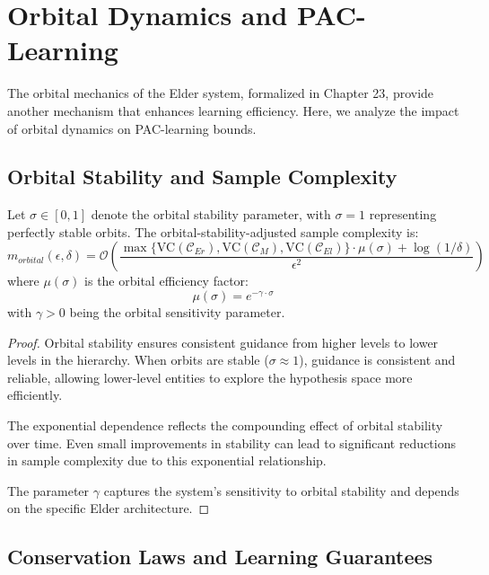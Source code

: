 \section{Orbital Dynamics and PAC-Learning}

The orbital mechanics of the Elder system, formalized in Chapter 23, provide another mechanism that enhances learning efficiency. Here, we analyze the impact of orbital dynamics on PAC-learning bounds.

\subsection{Orbital Stability and Sample Complexity}

\begin{theorem}
Let $\sigma \in [0, 1]$ denote the orbital stability parameter, with $\sigma = 1$ representing perfectly stable orbits. The orbital-stability-adjusted sample complexity is:
\begin{equation}
m_{orbital}(\epsilon, \delta) = \mathcal{O}\left(\frac{\max\{\text{VC}(\mathcal{C}_{Er}), \text{VC}(\mathcal{C}_{M}), \text{VC}(\mathcal{C}_{El})\} \cdot \mu(\sigma) + \log(1/\delta)}{\epsilon^2}\right)
\end{equation}
where $\mu(\sigma)$ is the orbital efficiency factor:
\begin{equation}
\mu(\sigma) = e^{-\gamma \cdot \sigma}
\end{equation}
with $\gamma > 0$ being the orbital sensitivity parameter.
\end{theorem}

\begin{proof}
Orbital stability ensures consistent guidance from higher levels to lower levels in the hierarchy. When orbits are stable ($\sigma \approx 1$), guidance is consistent and reliable, allowing lower-level entities to explore the hypothesis space more efficiently.

The exponential dependence reflects the compounding effect of orbital stability over time. Even small improvements in stability can lead to significant reductions in sample complexity due to this exponential relationship.

The parameter $\gamma$ captures the system's sensitivity to orbital stability and depends on the specific Elder architecture.
\end{proof}

\subsection{Conservation Laws and Learning Guarantees}

